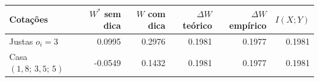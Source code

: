 \begin{tabular}{lrrrrr}
\toprule
Cotações & $W^*$ sem dica & $W$ com dica & $\Delta W$ teórico & $\Delta W$ empírico & $I(X;Y)$ \\
\midrule
Justas $o_i=3$ & 0.0995 & 0.2976 & 0.1981 & 0.1977 & 0.1981 \\
Casa $(1{,}8;\,3{,}5;\,5)$ & -0.0549 & 0.1432 & 0.1981 & 0.1977 & 0.1981 \\
\bottomrule
\end{tabular}
